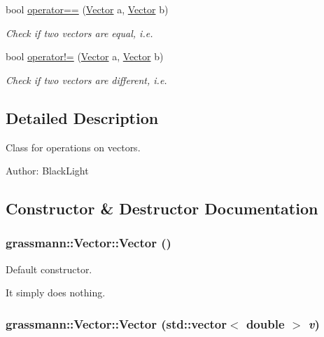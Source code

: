 \begin{CompactItemize}
\item 
bool \hyperlink{classgrassmann_1_1Vector_5d46747ad1ba11f461f4db8945e9bedf}{operator==} (\hyperlink{classgrassmann_1_1Vector}{Vector} a, \hyperlink{classgrassmann_1_1Vector}{Vector} b)
\begin{CompactList}\small\item\em Check if two vectors are equal, i.e. \item\end{CompactList}\item 
bool \hyperlink{classgrassmann_1_1Vector_a73d83b4b0d593774cdbc7874ef72e81}{operator!=} (\hyperlink{classgrassmann_1_1Vector}{Vector} a, \hyperlink{classgrassmann_1_1Vector}{Vector} b)
\begin{CompactList}\small\item\em Check if two vectors are different, i.e. \item\end{CompactList}\end{CompactItemize}


\subsection{Detailed Description}
Class for operations on vectors. 

\begin{Desc}
\item[Author:]BlackLight \end{Desc}


\subsection{Constructor \& Destructor Documentation}
\hypertarget{classgrassmann_1_1Vector_aa833e1ac1753a65c2885a9ce88ffeff}{
\subsubsection[Vector]{\setlength{\rightskip}{0pt plus 5cm}grassmann::Vector::Vector ()}}
\label{classgrassmann_1_1Vector_aa833e1ac1753a65c2885a9ce88ffeff}


Default constructor. 

It simply does nothing. \hypertarget{classgrassmann_1_1Vector_d8278186455c0ecbe065541a6c18a768}{
\subsubsection[Vector]{\setlength{\rightskip}{0pt plus 5cm}grassmann::Vector::Vector (std::vector$<$ double $>$ {\em v})}}
\label{classgrassmann_1_1Vector_d8278186455c0ecbe065541a6c18a768}


